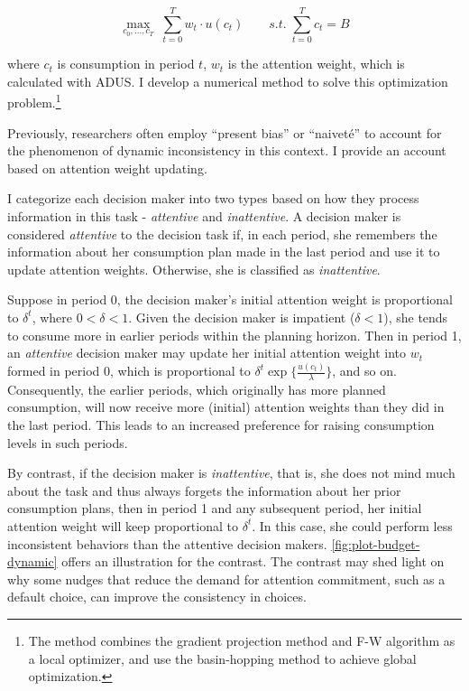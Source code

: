 \documentclass[
  12pt,
]{article}
\begin{document}
\[
\max_{c_0,...,c_T}\;\sum_{t=0}^T w_t\cdot u(c_t) \qquad s.t.\;\sum_{t=0}^T c_t=B  
\]

where \(c_t\) is consumption in period \(t\), \(w_t\) is the attention
weight, which is calculated with ADUS. I develop a numerical method to
solve this optimization problem.\footnote{The method combines the
  gradient projection method and F-W algorithm as a local optimizer, and
  use the basin-hopping method to achieve global optimization.}

Previously, researchers often employ ``present bias''
\citep{laibson_golden_1997} or ``naiveté'' \citep{odonoghue_doing_1999}
to account for the phenomenon of dynamic inconsistency in this context.
I provide an account based on attention weight updating.

I categorize each decision maker into two types based on how they
process information in this task - \emph{attentive} and
\emph{inattentive}. A decision maker is considered \emph{attentive} to
the decision task if, in each period, she remembers the information
about her consumption plan made in the last period and use it to update
attention weights. Otherwise, she is classified as \emph{inattentive}.

Suppose in period 0, the decision maker's initial attention weight is
proportional to \(\delta^t\), where \(0<\delta<1\). Given the decision
maker is impatient (\(\delta<1\)), she tends to consume more in earlier
periods within the planning horizon. Then in period 1, an
\emph{attentive} decision maker may update her initial attention weight
into \(w_t\) formed in period 0, which is proportional to
\(\delta^t\exp\{\frac{u(c_t)}{\lambda}\}\), and so on. Consequently, the
earlier periods, which originally has more planned consumption, will now
receive more (initial) attention weights than they did in the last
period. This leads to an increased preference for raising consumption
levels in such periods.

By contrast, if the decision maker is \emph{inattentive}, that is, she
does not mind much about the task and thus always forgets the
information about her prior consumption plans, then in period 1 and any
subsequent period, her initial attention weight will keep proportional
to \(\delta^t\). In this case, she could perform less inconsistent
behaviors than the attentive decision makers.
\ref{fig:plot-budget-dynamic} offers an illustration for the contrast.
The contrast may shed light on why some nudges that reduce the demand
for attention commitment, such as a default choice, can improve the
consistency in choices.
\end{document}
